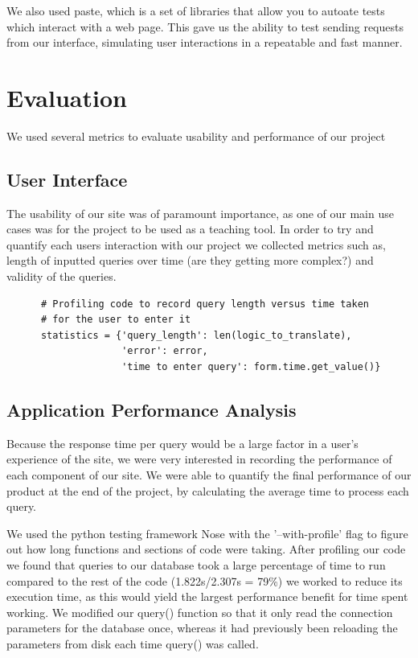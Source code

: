 \documentclass[a4paper, 11pt]{article}
\begin{document}
  We also used paste, which is a set of libraries that allow you to autoate
  tests which interact with a web page. This gave us the ability to test
  sending requests from our interface, simulating user interactions in a
  repeatable and fast manner.


\section{Evaluation}

    We used several metrics to evaluate usability and performance of our project
    \subsection{User Interface}
    The usability of our site was of paramount importance, as one of our main
    use cases was for the project to be used as a teaching tool. In order to try
    and quantify each users interaction with our project we collected metrics
    such as, length of inputted queries over time (are they getting more
    complex?) and validity of the queries.

    \begin{verbatim}
      # Profiling code to record query length versus time taken
      # for the user to enter it
      statistics = {'query_length': len(logic_to_translate),
                    'error': error,
                    'time to enter query': form.time.get_value()}

    \end{verbatim}
    
    \subsection{Application Performance Analysis}

    Because the response time per query would be a large factor in a user's
    experience of the site, we were very interested in recording the performance
    of each component of our site. We were able to quantify the final
    performance of our product at the end of the project, by calculating the
    average time to process each query.

    We used the python testing framework Nose with the '--with-profile' flag to
    figure out how long functions and sections of code were taking. 
    After profiling our code we found that queries to our database took a large
    percentage of time to run compared to the rest of the code (1.822s/2.307s =
    79\%) we worked to reduce its execution time, as this would yield the largest
    performance benefit for time spent working. 
    We modified our query() function so that it only read the connection 
    parameters for the database once, whereas it had previously been reloading 
    the  parameters from disk each time query() was called.  
\end{document}
